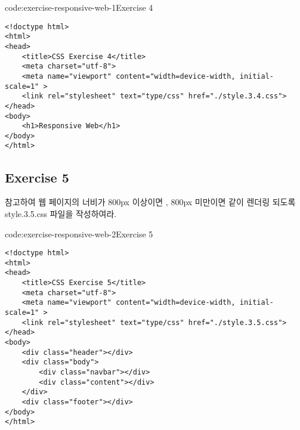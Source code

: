 \begin{codeenv}{code:exercise-responsive-web-1}{Exercise 4}\begin{verbatim}
<!doctype html>
<html>
<head>
    <title>CSS Exercise 4</title>
    <meta charset="utf-8">
    <meta name="viewport" content="width=device-width, initial-scale=1" >
    <link rel="stylesheet" text="type/css" href="./style.3.4.css">
</head>
<body>
    <h1>Responsive Web</h1>
</body>
</html>
\end{verbatim}
\end{codeenv}

\subsection*{Exercise 5}
\를 참고하여 웹 페이지의 너비가 800px 이상이면 , 800px 미만이면 \과 같이 렌더링 되도록 style.3.5.css 파일을 작성하여라.

\begin{codeenv}{code:exercise-responsive-web-2}{Exercise 5}\begin{verbatim}
<!doctype html>
<html>
<head>
    <title>CSS Exercise 5</title>
    <meta charset="utf-8">
    <meta name="viewport" content="width=device-width, initial-scale=1" >
    <link rel="stylesheet" text="type/css" href="./style.3.5.css">
</head>
<body>
    <div class="header"></div>
    <div class="body">
        <div class="navbar"></div>
        <div class="content"></div>
    </div>
    <div class="footer"></div>
</body>
</html>
\end{verbatim}
\end{codeenv}
\newpage

